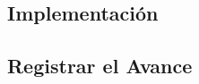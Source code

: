     


\subsection{Implementación}
\label{sub:implementacion_iteracion_2}


    

\subsection{Registrar el Avance}
\label{sub:iteracion2_avance}

